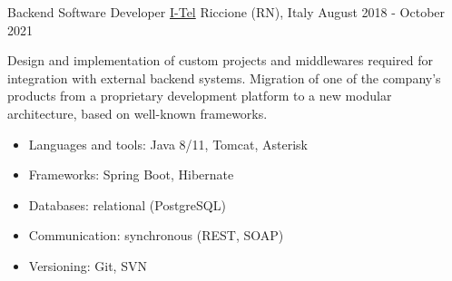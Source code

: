 \begin{cventries}

\cventry
    {Backend Software Developer} %
    {\href{https://i-tel.it}{I-Tel}} %
    {Riccione (RN), Italy} %
    {August 2018 - October 2021} %
    {
      	Design and implementation of custom projects and middlewares required for integration with external backend systems.
      	Migration of one of the company's products from a proprietary development platform to a new modular architecture, based on well-known frameworks.
      	\begin{itemize}
      		\item {Languages and tools: Java 8/11, Tomcat, Asterisk}
      		\item {Frameworks: Spring Boot, Hibernate}
      		\item {Databases: relational (PostgreSQL)}
      		\item {Communication: synchronous (REST, SOAP)}
      		\item {Versioning: Git, SVN}
      	\end{itemize}
    }


\end{cventries}
